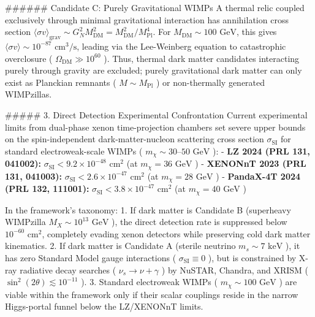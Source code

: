 \documentclass[11pt,a4paper]{article}
\theoremstyle{definition}
\theoremstyle{remark}
\begin{document}
\#\#\#\#\#\# Candidate C: Purely Gravitational WIMPs
A thermal relic coupled exclusively through minimal gravitational interaction has annihilation cross section $\langle \sigma v \rangle_{\text{grav}} \sim G_N^2 M_{\text{DM}}^2 = M_{\text{DM}}^2 / M_{\text{Pl}}^4$. For $M_{\text{DM}} \sim 100\text{ GeV}$, this gives $\langle \sigma v \rangle \sim 10^{-87}\text{ cm}^3/\text{s}$, leading via the Lee-Weinberg equation to catastrophic overclosure ( $\Omega_{\text{DM}} \gg 10^{60}$ ). Thus, thermal dark matter candidates interacting purely through gravity are excluded; purely gravitational dark matter can only exist as Planckian remnants ( $M \sim M_{\text{Pl}}$ ) or non-thermally generated WIMPzillas.

\#\#\#\#\# 3. Direct Detection Experimental Confrontation
Current experimental limits from dual-phase xenon time-projection chambers set severe upper bounds on the spin-independent dark-matter-nucleon scattering cross section $\sigma_{\text{SI}}$ for standard electroweak-scale WIMPs ( $m_\chi \sim 30\text{--}50\text{ GeV}$ ):
- \textbf{LZ 2024 (PRL 131, 041002):} $\sigma_{\text{SI}} < 9.2 \times 10^{-48}\text{ cm}^2$ (at $m_\chi = 36\text{ GeV}$ )
- \textbf{XENONnT 2023 (PRL 131, 041003):} $\sigma_{\text{SI}} < 2.6 \times 10^{-47}\text{ cm}^2$ (at $m_\chi = 28\text{ GeV}$ )
- \textbf{PandaX-4T 2024 (PRL 132, 111001):} $\sigma_{\text{SI}} < 3.8 \times 10^{-47}\text{ cm}^2$ (at $m_\chi = 40\text{ GeV}$ )

In the framework's taxonomy:
1. If dark matter is Candidate B (superheavy WIMPzilla $M_X \sim 10^{13}\text{ GeV}$ ), the direct detection rate is suppressed below $10^{-60}\text{ cm}^2$, completely evading xenon detectors while preserving cold dark matter kinematics.
2. If dark matter is Candidate A (sterile neutrino $m_s \sim 7\text{ keV}$ ), it has zero Standard Model gauge interactions ( $\sigma_{\text{SI}} \equiv 0$ ), but is constrained by X-ray radiative decay searches ( $\nu_s \to \nu + \gamma$ ) by NuSTAR, Chandra, and XRISM ( $\sin^2(2\theta) \lesssim 10^{-11}$ ).
3. Standard electroweak WIMPs ( $m_\chi \sim 100\text{ GeV}$ ) are viable within the framework only if their scalar couplings reside in the narrow Higgs-portal funnel below the LZ/XENONnT limits.
\end{document}
